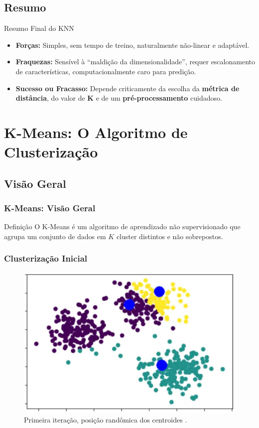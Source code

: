 \documentclass{beamer}
\begin{document}
\subsection{Resumo}
\begin{frame}{Resumo Final do KNN}

    
    \begin{itemize}
        \item \textbf{Forças:} Simples, sem tempo de treino, naturalmente não-linear e adaptável.
        \pause
        \item \textbf{Fraquezas:} Sensível à ``maldição da dimensionalidade'', requer escalonamento de características, computacionalmente caro para predição.
        \pause
        \item \textbf{Sucesso ou Fracasso:} Depende criticamente da escolha da \textbf{métrica de distância}, do valor de \textbf{K} e de um \textbf{pré-processamento} cuidadoso.
    \end{itemize}
\end{frame}

\section{K-Means: O Algoritmo de Clusterização}
\subsection{Visão Geral}
\begin{frame}
    \frametitle{K-Means: Visão Geral}
    \begin{block}{Definição}
        O K-Means é um algoritmo de aprendizado não supervisionado que agrupa um conjunto de dados em $K$ cluster distintos e não sobrepostos.
    \end{block}

\end{frame}

\begin{frame}
    \frametitle{Clusterização Inicial}
    \begin{figure}
    \centering
    \includegraphics[width=0.6\linewidth]{imagens/1_tEKlqzqtKI3-I0pYSS7oHA.png}
    \caption{Primeira iteração, posição randômica dos centroides \cite{medium_cwi_kmeans}.
}
    \label{fig:centroiderandomico}
\end{figure}
\end{frame}
\end{document}
